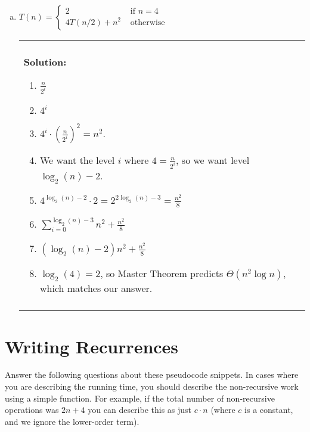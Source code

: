 \documentclass[12pt]{article}
\newenvironment{solution}
	{\begin{center}
	\begin{tabular}{|p{0.9\textwidth}|}
	\hline\\
	\textbf{Solution:}
	}
	{\\\\
	\hline
	\end{tabular}
	\end{center}
	}
\begin{document}
\begin{enumerate}[a)]
\begin{solution}
\begin{enumerate}[1.]
						\item $\log_3(2) < 1$ so we should get $\Theta(n)$. The crazy formula from the last part is actually $\Theta(n)$. The second term is on the order of $n^{\log_3(2)}$, which is asymptotically less than $n$ (since $\log_3(2) < 1$) In the first term, the denominator is negative, so it's really $n\left(c - c'\left(\frac{2}{3}\right)^{\log_3(n) - 1 }\right)$ (where $c,c'$ are constants. As $n$ gets larger, $\left(\frac{2}{3}\right)^{\log_3(n) - 1 }$ is getting smaller. So $cn$ really is the dominating term.
					\end{enumerate}
					\end{solution}
	\newpage
	\item $ T(n) = \begin{cases} 2 &\text{ if }n=4\\
					4T(n/2) + n^2 &\text{ otherwise}
					\end{cases}$
			\begin{solution}
				\begin{enumerate}[1.]
					\item $\frac{n}{2^i}$
					\item $4^i$
					\item $4^i \cdot \left(\frac{n}{2^i}\right)^2 = n^2$. 
					\item We want the level $i$ where $4 = \frac{n}{2^i}$, so we want level $\log_2(n) - 2$. 
					\item $4^{\log_2(n) - 2} \cdot 2 = 2^{2\log_2(n) - 3} = \frac{n^2}{8}$
					\item $\sum\limits_{i=0}^{\log_2(n) - 3}  n^2 + \frac{n^2}{8} $
					\item $ (\log_2(n) - 2)n^2 + \frac{n^2}{8}$
					\item $\log_2(4) = 2$, so Master Theorem predicts $\Theta(n^2 \log n)$, which matches our answer.
				\end{enumerate}
			\end{solution}
\end{enumerate}

\section{Writing Recurrences}
Answer the following questions about these pseudocode snippets.
In cases where you are describing the running time, you should describe the non-recursive work using a simple function. For example, if the total number of non-recursive operations was $2n+4$ you can describe this as just $c\cdot n$ (where $c$ is a constant, and we ignore the lower-order term). 
\end{document}
